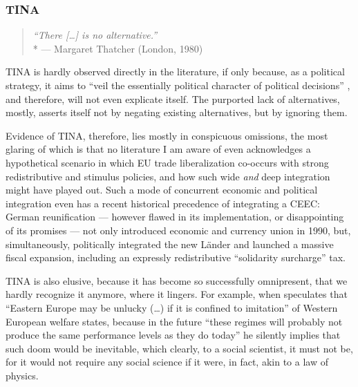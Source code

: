 \subsubsection{TINA}

\begin{quote}
	\emph{``There [\ldots] is no alternative.''}
	\\*
	--- Margaret Thatcher (London, 1980)
\end{quote}

TINA is hardly observed directly in the literature, if only because, as a political strategy, it aims to ``veil the essentially political character of political decisions'' \citep[314]{Bluhdorn-2007-aa}, and therefore, will not even explicate itself.
The purported lack of alternatives, mostly, asserts itself not by negating existing alternatives, but by ignoring them.

Evidence of TINA, therefore, lies mostly in conspicuous omissions, the most glaring of which is that no literature I am aware of even acknowledges a hypothetical scenario in which \gls{EU} trade liberalization co-occurs with strong redistributive and stimulus policies, and how such wide \emph{and} deep integration might have played out.
  Such a mode of concurrent economic and political integration even has a recent historical precedence of integrating a \gls{CEEC}:
  German reunification --- however flawed in its implementation, or disappointing of its promises --- not only introduced economic and currency union in 1990, but, simultaneously, politically integrated the new Länder and launched a massive fiscal expansion, including an expressly redistributive ``solidarity surcharge'' tax.

TINA is also elusive, because it has become so successfully omnipresent, that we hardly recognize it anymore, where it lingers.
For example, when \citeauthor{Kovasc} speculates that ``Eastern Europe may be unlucky (\ldots) if it is confined to imitation'' of Western European welfare states, because in the future ``these regimes will probably not produce the same performance levels as they do today'' he silently implies that such doom would be inevitable, which clearly, to a social scientist, it must not be, for it would not require any social science if it were, in fact, akin to a law of physics.

